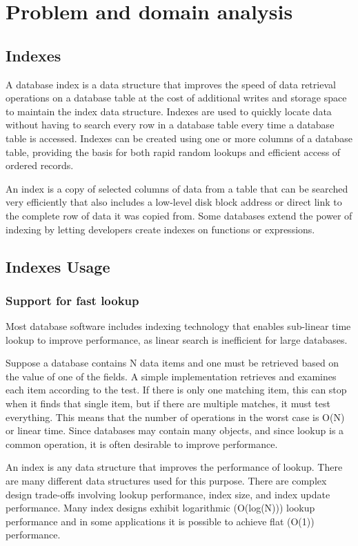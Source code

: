 \section{Problem and domain analysis}

\subsection{Indexes}

A database index is a data structure that improves the speed of data retrieval operations on a database table at the cost of additional writes and storage space to maintain the index data structure. Indexes are used to quickly locate data without having to search every row in a database table every time a database table is accessed. Indexes can be created using one or more columns of a database table, providing the basis for both rapid random lookups and efficient access of ordered records.

An index is a copy of selected columns of data from a table that can be searched very efficiently that also includes a low-level disk block address or direct link to the complete row of data it was copied from. Some databases extend the power of indexing by letting developers create indexes on functions or expressions. 

\subsection{Indexes Usage}
\subsubsection{Support for fast lookup}
Most database software includes indexing technology that enables sub-linear time lookup to improve performance, as linear search is inefficient for large databases.

Suppose a database contains N data items and one must be retrieved based on the value of one of the fields. A simple implementation retrieves and examines each item according to the test. If there is only one matching item, this can stop when it finds that single item, but if there are multiple matches, it must test everything. This means that the number of operations in the worst case is O(N) or linear time. Since databases may contain many objects, and since lookup is a common operation, it is often desirable to improve performance.

An index is any data structure that improves the performance of lookup. There are many different data structures used for this purpose. There are complex design trade-offs involving lookup performance, index size, and index update performance. Many index designs exhibit logarithmic (O(log(N))) lookup performance and in some applications it is possible to achieve flat (O(1)) performance.

